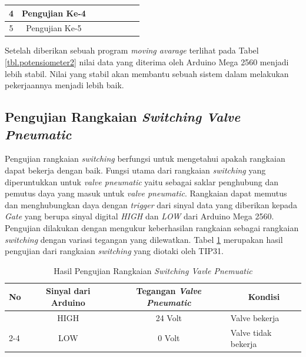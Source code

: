 \begin{table}[H]
\begin{tabular}{|c|c|c|c|c|c|c|c|}
		4                                            & Pengujian Ke-4                                      &                              &                              &                             &                            &                             &                             \\ \hline
		5                                            & Pengujian Ke-5                                      &                              &                              &                             &                            &                             &                             \\ \hline
	\end{tabular}
	
\end{table} 

Setelah diberikan sebuah program \textit{moving avarage} terlihat pada Tabel \ref{tbl.potensiometer2} nilai data yang diterima oleh Arduino Mega 2560 menjadi lebih stabil. Nilai yang stabil akan membantu sebuah sistem dalam melakukan pekerjaannya menjadi lebih baik.

\subsection{Pengujian Rangkaian \textit{Switching Valve Pneumatic}}
Pengujian rangkaian \textit{switching} berfungsi untuk mengetahui apakah rangkaian dapat bekerja dengan baik. Fungsi utama dari rangkaian \textit{switching} yang diperuntukkan untuk \textit{valve pneumatic} yaitu sebagai saklar penghubung dan pemutus daya yang masuk untuk \textit{valve pneumatic}. Rangkaian dapat memutus dan menghubungkan daya dengan \textit{trigger} dari sinyal data yang diberikan kepada \textit{Gate} yang berupa sinyal digital \textit{HIGH} dan \textit{LOW} dari Arduino Mega 2560. Pengujian dilakukan dengan mengukur keberhasilan rangkaian sebagai rangkaian \textit{switching} dengan variasi tegangan yang dilewatkan. Tabel \ref{tbl.rangkaiantip} merupakan hasil pengujian dari rangkaian \textit{switching} yang diotaki oleh TIP31.
\begin{table}[H]
	\centering
	\caption{Hasil Pengujian Rangkaian \textit{Switching Vavle Pnemuatic}}
	\label{tbl.rangkaiantip}
	\begin{tabular}{|l|c|c|l|}
		\hline
		\rowcolor[HTML]{9B9B9B} 
		No                  & Sinyal dari Arduino & Tegangan \textit{Valve Pneumatic} & \multicolumn{1}{c|}{\cellcolor[HTML]{9B9B9B}Kondisi} \\ \hline
		& HIGH                & 24 Volt                  & Valve bekerja                                        \\ \cline{2-4} 
		\multirow{-2}{*}{1} & LOW                 & 0 Volt                   & Valve tidak bekerja                                  \\ \hline
	\end{tabular}
	
\end{table} 

